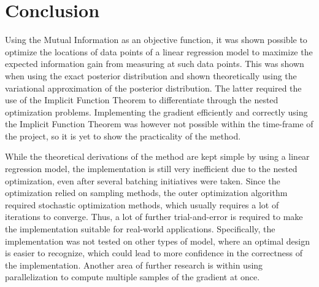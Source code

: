 \section{Conclusion}
Using the Mutual Information as an objective function, it was shown possible to optimize 
the locations of data points of a linear regression model to maximize the expected information gain from measuring at such data points.
This was shown when using the exact posterior distribution 
and shown theoretically using the variational approximation of the posterior distribution.
The latter required the use of the Implicit Function Theorem to differentiate through the nested optimization problems.
Implementing the gradient efficiently and correctly using the Implicit Function Theorem was however not possible within the time-frame of the project,
so it is yet to show the practicality of the method.

While the theoretical derivations of the method are kept simple by using a linear regression model, the implementation is still very inefficient
due to the nested optimization, even after several batching initiatives were taken.
Since the optimization relied on sampling methods, the outer optimization algorithm required stochastic optimization methods,
which usually requires a lot of iterations to converge. Thus, a lot of further trial-and-error is required to make the implementation suitable for real-world applications.
Specifically, the implementation was not tested on other types of model, where an optimal design is easier to recognize, which could lead to more confidence in the correctness of the implementation.
Another area of further research is within using parallelization to compute multiple samples of the gradient at once.
